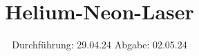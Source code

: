 

\subject{Versuch V61}
\title{Helium-Neon-Laser}
\date{%
  Durchführung: 29.04.24
  \hspace{3em}
  Abgabe: 02.05.24
}



\maketitle
\thispagestyle{empty}
\tableofcontents
\newpage






\printbibliography



